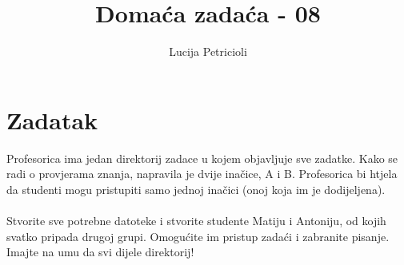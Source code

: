 \documentclass[12pt,a4paper]{article}
\begin{document}
	\title{Domaća zadaća - 08}
	\author{Lucija Petricioli}
	\maketitle
	\section{Zadatak}
	Profesorica ima jedan direktorij {\ttfamily zadace} u kojem objavljuje sve zadatke. Kako se radi o provjerama znanja, napravila je dvije inačice, A i B. Profesorica bi htjela da studenti mogu pristupiti samo jednoj inačici (onoj koja im je dodijeljena). \\
	\\
	Stvorite sve potrebne datoteke i stvorite studente {\ttfamily Matiju} i {\ttfamily Antoniju}, od kojih svatko pripada drugoj grupi. Omogućite im pristup zadaći i zabranite pisanje. Imajte na umu da  svi dijele direktorij!
	
\end{document}
